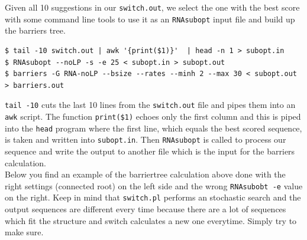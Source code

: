 \documentclass[a4paper]{article}
\begin{document}
Given all 10 suggestions in our \texttt{switch.out}, we select the one with the best score 
with some command line tools to use it as an \texttt{RNAsubopt} input file and build up the barriers tree.
\begin{verbatim}
$ tail -10 switch.out | awk '{print($1)}'  | head -n 1 > subopt.in
$ RNAsubopt --noLP -s -e 25 < subopt.in > subopt.out
$ barriers -G RNA-noLP --bsize --rates --minh 2 --max 30 < subopt.out > barriers.out
\end{verbatim}

\texttt{tail -10} cuts the last 10 lines from the \texttt{switch.out} file and pipes them into 
an \texttt{awk} script. The function \texttt{print(\$1)} echoes only the first column and this 
is piped into the \texttt{head} program where the first line, which equals the best scored 
sequence, is taken and written into \texttt{subopt.in}. Then \texttt{RNAsubopt} is called 
to process our sequence and write the output to another file which is the input for the 
barriers calculation.\\

Below you find an example of the barriertree calculation above done with the right settings (connected root) 
on the left side and the wrong \texttt{RNAsubobt -e} value on the right. Keep in mind that 
\texttt{switch.pl} performs an stochastic search and the output sequences are different every time 
because there are a lot of sequences which fit the structure and switch calculates a new one 
everytime. Simply try to make sure.\\
\end{document}

